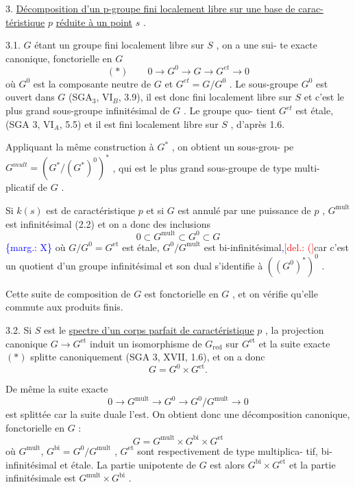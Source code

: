 \documentclass[11pt]{article}
\newcommand{\scanpage}[1]{\par\bigskip\noindent{\small\sffamily[scan #1]}\par}
\newcommand{\mspage}[1]{{\small\sffamily[p.\,#1]}}
\newcommand{\hand}[1]{\textcolor{blue}{#1}}
\newcommand{\margin}[1]{\textcolor{blue}{\{\textsf{marg.:} #1\}}}
\newcommand{\deleted}[1]{\textcolor{red}{[\textsf{del.:} #1]}}
\newcommand{\uline}[1]{\underline{#1}}
\begin{document}
3. \uline{Décomposition d'un p-groupe fini localement libre sur une base de carac-}
\uline{téristique} $p$ \uline{réduite à un point} $s$ .

3.1. $G$ étant un groupe fini localement libre sur $S$ , on a une sui-%
te exacte canonique, fonctorielle en $G$
\[ (*) \qquad 0 \rightarrow G^{0} \rightarrow G \rightarrow G^{et} \rightarrow 0 \]
où $G^{0}$ est la composante neutre de $G$ et $G^{et} = G/G^{0}$ . Le sous-groupe $G^{0}$
est ouvert dans $G$ (SGA$_{3}$, VI$_{B}$, 3.9), il est donc fini localement libre sur
$S$ et c'est le plus grand sous-groupe infinitésimal de $G$ . Le groupe quo-%
tient $G^{et}$ est étale, (SGA 3, VI$_{A}$, 5.5) et il est fini localement libre
sur $S$ , d'après 1.6.

Appliquant la même construction à $G^{*}$ , on obtient un sous-grou-%
pe $G^{mult} = (G^{*}/(G^{*})^{0})^{*}$ , qui est le plus grand sous-groupe de type multi-%
plicatif de $G$ .

\mspage{\hand{38}}

\clearpage
\scanpage{129/39}
\mspage{\hand{II.11}}

Si $k(s)$ est de caractéristique $p$ et si $G$ est annulé
par une puissance de $p$ , $G^{\mathrm{mult}}$ est infinitésimal (2.2) et on a donc
des inclusions
\[ 0 \subset G^{\mathrm{mult}} \subset G^{0} \subset G \]
\margin{X} où $G/G^{0} = G^{\mathrm{et}}$ est étale, $G^{0}/G^{\mathrm{mult}}$ est bi-infinitésimal\hand{,}\deleted{(}car c'est
un quotient d'un groupe infinitésimal et son dual s'identifie à $((G^{0})^{*})^{0}$ .

Cette suite de composition de $G$ est fonctorielle en $G$ ,
et on vérifie qu'elle commute aux produits finis.

3.2. Si $S$ est le \uline{spectre d'un corps parfait de caractéristique} $p$ ,
la projection canonique $G \to G^{\mathrm{et}}$ induit un isomorphisme de $G_{\mathrm{red}}$ sur
$G^{\mathrm{et}}$ et la suite exacte $(*)$ splitte canoniquement (SGA 3, XVII, 1.6),
et on a donc
\[ G = G^{0} \times G^{\mathrm{et}} . \]

De même la suite exacte
\[ 0 \to G^{\mathrm{mult}} \to G^{0} \to G^{0}/G^{\mathrm{mult}} \to 0 \]
est splittée car la suite duale l'est. On obtient donc une décomposition
canonique, fonctorielle en $G$ :
\[ G = G^{\mathrm{mult}} \times G^{\mathrm{bi}} \times G^{\mathrm{et}} \]
où $G^{\mathrm{mult}}$, $G^{\mathrm{bi}} = G^{0}/G^{\mathrm{mult}}$ , $G^{\mathrm{et}}$ sont respectivement de type multiplica-%
tif, bi-infinitésimal et étale. La partie unipotente de $G$ est alors
$G^{\mathrm{bi}} \times G^{\mathrm{et}}$ et la partie infinitésimale est $G^{\mathrm{mult}} \times G^{\mathrm{bi}}$ .
\end{document}
